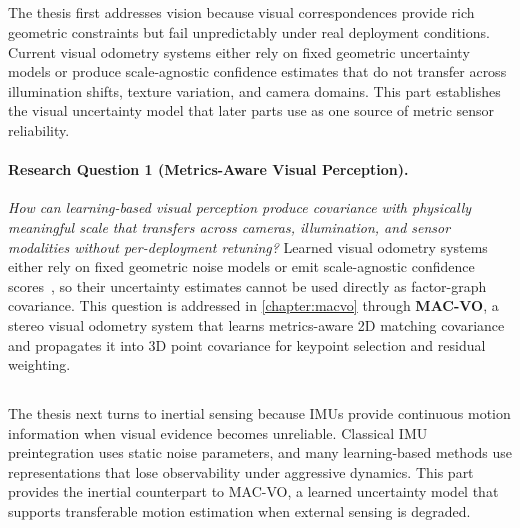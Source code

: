\subsection{\partITitle}
\label{subsec:org_part1}

The thesis first addresses vision because visual correspondences provide rich geometric constraints but fail unpredictably under real deployment conditions.
Current visual odometry systems either rely on fixed geometric uncertainty models or produce scale-agnostic confidence estimates that do not transfer across illumination shifts, texture variation, and camera domains.
This part establishes the visual uncertainty model that later parts use as one source of metric sensor reliability.

\paragraph{Research Question 1 (Metrics-Aware Visual Perception).}
\textit{How can learning-based visual perception produce covariance with physically meaningful scale that transfers across cameras, illumination, and sensor modalities without per-deployment retuning?}
Learned visual odometry systems either rely on fixed geometric noise models or emit scale-agnostic confidence scores~\cite{teed2021droid, teed2024deep}, so their uncertainty estimates cannot be used directly as factor-graph covariance.
This question is addressed in \cref{chapter:macvo} through \textbf{MAC-VO}, a stereo visual odometry system that learns metrics-aware 2D matching covariance and propagates it into 3D point covariance for keypoint selection and residual weighting.

\subsection{\partIITitle}
\label{subsec:org_part2}

The thesis next turns to inertial sensing because IMUs provide continuous motion information when visual evidence becomes unreliable.
Classical IMU preintegration uses static noise parameters, and many learning-based methods use representations that lose observability under aggressive dynamics.
This part provides the inertial counterpart to MAC-VO, a learned uncertainty model that supports transferable motion estimation when external sensing is degraded.

